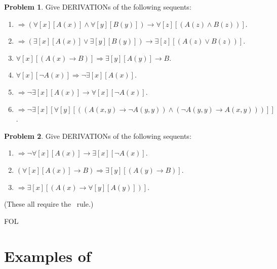\documentclass[10pt,a4paper]{article}
\newcommand*{\olup}[1]{\MakeUppercase{#1}}
\theoremstyle{plain}
\theoremstyle{definition}
\newtheorem{prob}{Problem}[section]
\theoremstyle{remark}
\newcommand*{\olfileid}[3]{}
\newcommand*{\olsection}[1]{\section*{#1}}
\providecommand{\lif}{\mathbin{\rightarrow}}
\providecommand{\lforall}{\mathord{\forall}}
\providecommand{\lexists}{\mathord{\exists}}
\providecommand{\Sequent}{\mathrel{\Rightarrow}}
\providecommand{\iftag}[1]{#1}
\providecommand{\RightR}[1]{}
\providecommand{\RightR}{\mathrm{R}}
\providecommand{\Contraction}{\mathrm{C}}
\providecommand{\iftag}{}
\begin{document}
\begin{prob}
Give \olup{derivation}s of the following sequents:
\begin{enumerate}
\item $\Sequent (\lforall[x][A(x)] \land \lforall[y][B(y)]) \lif
\lforall[z][(A(z) \land B(z))]$.
\item $\Sequent (\lexists[x][A(x)] \lor \lexists[y][B(y)]) \lif
\lexists[z][(A(z) \lor B(z))]$.
\item $\lforall[x][(A(x) \lif B)] \Sequent \lexists[y][A(y)] \lif B$.
\item $\lforall[x][\lnot A(x)] \Sequent \lnot\lexists[x][A(x)]$.
\item $\Sequent \lnot\lexists[x][A(x)] \lif \lforall[x][\lnot A(x)]$.
\item $\Sequent \lnot\lexists[x][\lforall[y][((A(x,y) \lif \lnot
A(y,y)) \land (\lnot A(y,y) \lif A(x,y)))]]$.
\end{enumerate}
\end{prob}

\begin{prob}
Give \olup{derivation}s of the following sequents:
\begin{enumerate}
\item $\Sequent \lnot\lforall[x][A(x)] \lif \lexists[x][\lnot A(x)]$.
\item $(\lforall[x][A(x)] \lif B) \Sequent \lexists[y][(A(y) \lif B)]$.
\item $\Sequent \lexists[x][(A(x) \lif \lforall[y][A(y)])]$.
\end{enumerate}
(These all require the $\RightR{\Contraction}$~rule.)
\end{prob}





\iftag{FOL}
      {\olfileid{fol}{seq}{pro}}
      {\olfileid{pl}{seq}{pro}}

\olsection{Examples of }
\end{document}
